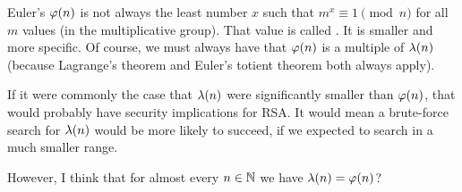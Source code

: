 \begin{remark}
  Euler's $\varphi\mathopen{}\left( {n} \right)\mathclose{}$ is not always the least number $x$ such that $m^x
  \equiv 1 \pmod{n}$ for all $m$ values (in the multiplicative group).
  That value is called . It is
  smaller and more specific. Of course, we must always have that
  $\varphi\mathopen{}\left( {n} \right)\mathclose{}$ is a multiple of $\lambda\mathopen{}\left( {n} \right)\mathclose{}$ (because Lagrange's theorem
  and Euler's totient theorem both always apply).

  If it were commonly the case that $\lambda\mathopen{}\left( {n} \right)\mathclose{}$ were significantly
  smaller than $\varphi\mathopen{}\left( {n} \right)\mathclose{}$, that would probably have security
  implications for RSA. It would mean a brute-force search for
  $\lambda\mathopen{}\left( {n} \right)\mathclose{}$ would be more likely to succeed, if we expected to
  search in a much smaller range.

  However, I think that for almost every $n\in\mathbb{N}$ we have $\lambda\mathopen{}\left( {n} \right)\mathclose{} =
  \varphi\mathopen{}\left( {n} \right)\mathclose{}$?
\end{remark}
